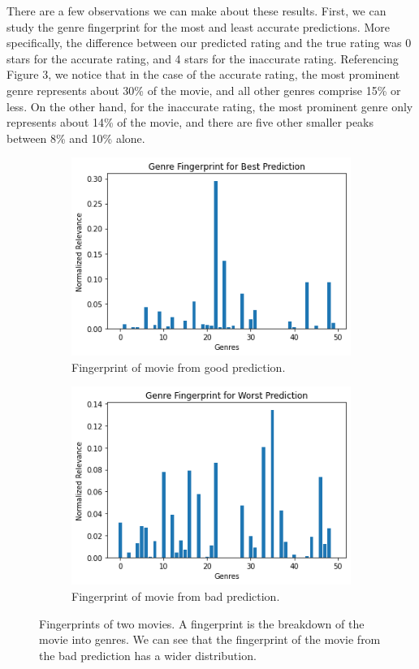 \documentclass[letterpaper, 10 pt, conference]{ieeeconf}  %
\begin{document}
There are a few observations we can make about these results. First, we can study the genre fingerprint for the most and least accurate predictions. More specifically, the difference between our predicted rating and the true rating was 0 stars for the accurate rating, and 4 stars for the inaccurate rating. Referencing Figure 3, we notice that in the case of the accurate rating, the most prominent genre represents about 30\% of the movie, and all other genres comprise 15\% or less. On the other hand, for the inaccurate rating, the most prominent genre only represents about 14\% of the movie, and there are five other smaller peaks between 8\% and 10\% alone.

\begin{figure}[h]
   \begin{subfigure}[b]{\columnwidth}
      \includegraphics[width=\linewidth]{./figs/bestfingerprint.png}
      \caption{Fingerprint of movie from good prediction.}
   \end{subfigure}
   \hfill
   \begin{subfigure}[b]{\columnwidth}
      \includegraphics[width=\linewidth]{./figs/worstfingerprint.png}
      \caption{Fingerprint of movie from bad prediction.}
   \end{subfigure}
   \caption{Fingerprints of two movies. A fingerprint is the breakdown of the movie into genres. We can see that the fingerprint of the movie from the bad prediction has a wider distribution.}
\end{figure}
\end{document}
